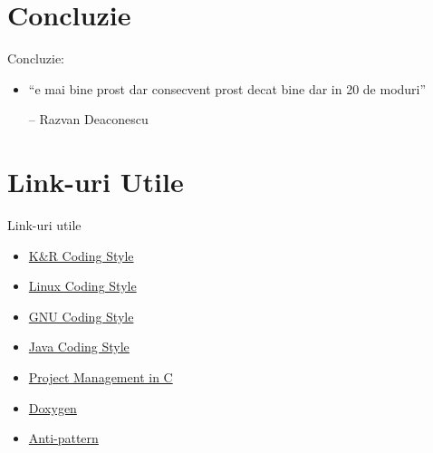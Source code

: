 \documentclass{beamer}
\begin{document}
\section{Concluzie}
  
  \frame{\tableofcontents[currentsection]}
  
  \begin{frame}{Concluzie:}
  \begin{itemize}
  \item ``e mai bine prost dar consecvent prost decat bine dar in 20 de moduri''\\ \begin{flushright}-- Razvan Deaconescu \end{flushright}
  \end{itemize}
  \end{frame}

\section{Link-uri Utile}

  \frame{\tableofcontents[currentsection]}

  \begin{frame}{Link-uri utile}
  \begin{itemize}
  \setlength{\itemsep}{0.5cm}
  \item \href{http://www.cs.su.oz.au/\~scilect/tpop/handouts/Style.htm}{K\&R Coding Style}
  \item \href{http://lxr.linux.no/linux/Documentation/CodingStyle}{Linux Coding Style}
  \item \href{http://www.gnu.org/prep/standards/standards.html}{GNU Coding Style}
  \item \href{http://java.sun.com/docs/codeconv/}{Java Coding Style}
  \item \href{http://www.cs.cf.ac.uk/Dave/C/node35.html}{Project Management in C}
  \item \href{http://www.stack.nl/\~dimitri/doxygen/}{Doxygen}
  \item \href{http://en.wikipedia.org/wiki/Anti-pattern}{Anti-pattern}
  \end{itemize}
  \end{frame}
\end{document}
